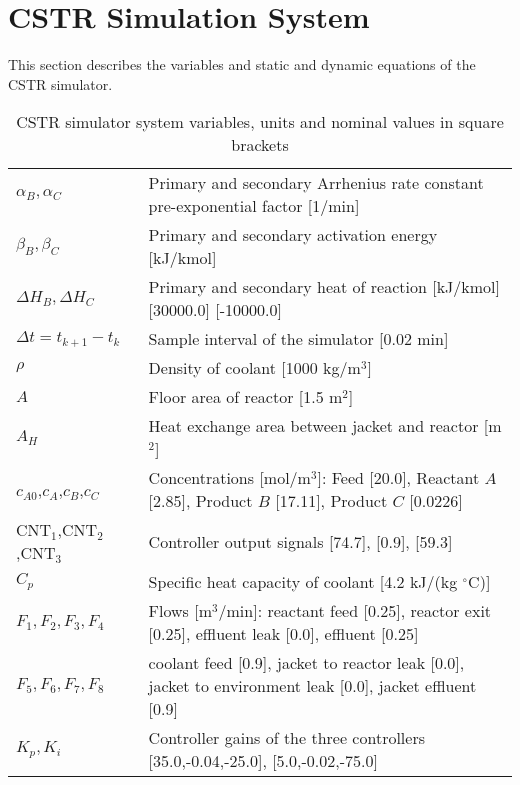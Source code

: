 \documentclass[10pt, conference, compsocconf]{IEEEtran}
\newcommand{\celsius}{$^{\circ}$C}
\begin{document}
\appendices
\setcounter{equation}{0}
\renewcommand{\theequation}{\thesection.\arabic{equation}}
\setcounter{table}{0}
\renewcommand{\thetable}{\thesection.\arabic{table}}



\section{CSTR Simulation System}\label{appendix:cstrmodel}

This section describes the variables and static and
dynamic equations of the CSTR simulator.

\begin{table}[ht]
\begin{center}
\caption{CSTR simulator system variables, units and nominal values in square brackets}
\begin{tabular}{p{2cm}p{5.8cm}}
$\alpha_{B}, \alpha_{C}$	& Primary and secondary Arrhenius rate constant pre-exponential factor [1/min] \\
$\beta_{B}, \beta_{C}$	& Primary and secondary activation energy [kJ/kmol] \\
$\Delta H_{B}, \Delta H_{C}$ 	& Primary and secondary heat of reaction [kJ/kmol] [30000.0] [-10000.0] \\
$\Delta t =t_{k+1}-t_{k}$	& Sample interval of the simulator [0.02 min] \\
$\rho$	&	Density of coolant [1000 kg/m$^{3}$] \\
$A$	&	Floor area of reactor [1.5 m$^{2}$] \\
$A_{H}$	&	Heat exchange area between jacket and reactor [m$^{2}$] \\
$c_{A0}$,$c_{A}$,$c_{B}$,$c_{C}$ &Concentrations [mol/m$^{3}$]: Feed [20.0], Reactant $A$ [2.85],
Product $B$ [17.11], Product $C$ [0.0226] \\
CNT$_{1}$,CNT$_{2}$,CNT$_{3}$	& Controller output signals [74.7], [0.9], [59.3] \\
$C_{p}$	&	Specific heat capacity of coolant [4.2 kJ/(kg \celsius)] \\
$F_{1},F_{2},F_{3},F_{4}$ & Flows [m$^{3}$/min]: reactant feed [0.25], reactor exit [0.25],
	effluent leak [0.0], effluent [0.25] \\
$F_{5},F_{6},F_{7},F_{8}$ & coolant feed [0.9], jacket to reactor leak [0.0],
	jacket to environment leak [0.0], jacket effluent [0.9] \\ 
$K_{p},K_{i}$ & Controller gains of the three controllers [35.0,-0.04,-25.0], [5.0,-0.02,-75.0] \\

\end{tabular}
\end{center}
\end{table}
\end{document}
